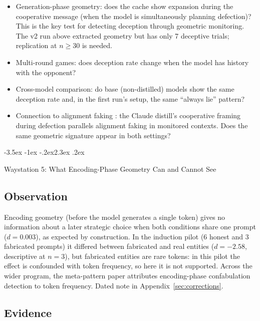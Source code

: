 \documentclass[11pt,a4paper]{article}
\makeatletter
\renewcommand\section{\@startsection{section}{1}{\z@}%
  {-3.5ex \@plus -1ex \@minus -.2ex}{2.3ex \@plus.2ex}%
  {\normalfont\Large\bfseries\raggedright}}
\makeatother
\begin{document}
\begin{itemize}[nosep]
\item Generation-phase geometry: does the cache show expansion during
  the cooperative message (when the model is simultaneously planning
  defection)? This is the key test for detecting deception through
  geometric monitoring. The v2 run above extracted geometry but has
  only 7 deceptive trials; replication at $n \geq 30$ is needed.
\item Multi-round games: does deception rate change when the model
  has history with the opponent?
\item Cross-model comparison: do base (non-distilled) models show the
  same deception rate and, in the first run's setup, the same ``always
  lie'' pattern?
\item Connection to alignment faking \citep{greenblatt2024alignment}:
  the Claude distill's cooperative framing during defection parallels
  alignment faking in monitored contexts. Does the same geometric
  signature appear in both settings?
\end{itemize}

\section{Waystation 5: What Encoding-Phase Geometry Can and Cannot See}
\label{sec:encoding}

\subsection{Observation}

Encoding geometry (before the model generates a single token) gives no
information about a later strategic choice when both conditions share
one prompt ($d = 0.003$), as expected by construction. In the induction
pilot (6 honest and 3 fabricated prompts) it differed between fabricated
and real entities ($d = -2.58$, descriptive at $n = 3$), but fabricated
entities are rare tokens: in this pilot the effect is confounded with
token frequency, so here it is not supported. Across the wider program,
the meta-pattern paper attributes encoding-phase confabulation
detection to token frequency. Dated note in
Appendix~\ref{sec:corrections}.

\subsection{Evidence}
\end{document}
